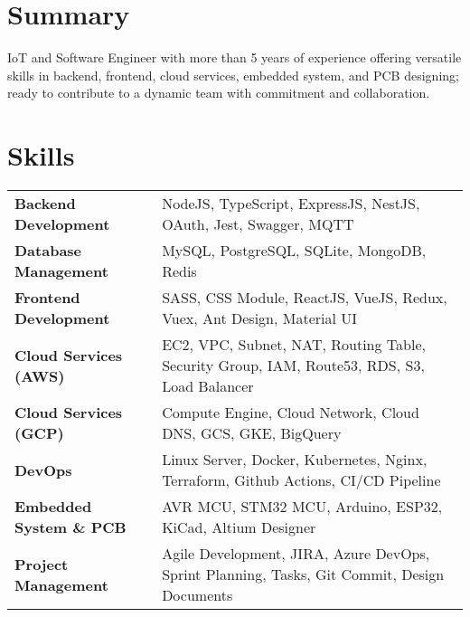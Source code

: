\documentclass {article}
\begin{document}

\section{Summary}
IoT and Software Engineer with more than 5 years of experience offering versatile skills in backend, frontend, cloud services, embedded system, and PCB designing; ready to contribute to a dynamic team with commitment and collaboration.

\section{Skills}
\begin{tabularx}{\linewidth}{@{}l X@{}}
  \textbf{Backend Development} & NodeJS, TypeScript, ExpressJS, NestJS, OAuth, Jest, Swagger, MQTT\\
  \textbf{Database Management} & MySQL, PostgreSQL, SQLite, MongoDB, Redis\\ 
  \textbf{Frontend Development} & SASS, CSS Module, ReactJS, VueJS, Redux, Vuex, Ant Design, Material UI\\ 
  \textbf{Cloud Services (AWS)} & EC2, VPC, Subnet, NAT, Routing Table, Security Group, IAM, Route53, RDS, S3, Load Balancer\\ 
  \textbf{Cloud Services (GCP)} & Compute Engine, Cloud Network, Cloud DNS, GCS, GKE, BigQuery\\
  \textbf{DevOps} & Linux Server, Docker, Kubernetes, Nginx,  Terraform, Github Actions, CI/CD Pipeline\\
  \textbf{Embedded System \& PCB} & AVR MCU, STM32 MCU, Arduino, ESP32, KiCad, Altium Designer\\
  \textbf{Project Management} & Agile Development, JIRA, Azure DevOps, Sprint Planning, Tasks, Git Commit, Design Documents\\
\end{tabularx}

\end{document}
